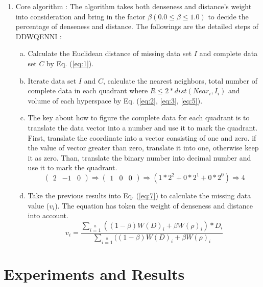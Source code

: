 \documentclass[print]{jicspack}
\begin{document}
\begin{enumerate}[(1)]
\item Core algorithm : The algorithm takes both denseness and distance's weight into consideration and bring in the factor $\beta (0.0 \leq \beta \leq 1.0)$ to decide the percentage of denseness and distance.  The followings are the detailed steps of DDWQENNI :
\begin{enumerate}[a.]
  \item Calculate the Euclidean distance of missing data set $I$ and complete data set $C$ by Eq. (\ref{eq:1}).
  \item Iterate data set $I$ and $C$, calculate the nearest neighbors, total number of complete data in each quadrant where $R \leq 2 * dist(Near_i, I_i)$ and volume of each hyperspace by Eq. (\ref{eq:2}, \ref{eq:3}, \ref{eq:5}).
  \item The key about how to figure the complete data for each quadrant is to translate the data vector into a number and use it to mark the quadrant. First, translate the coordinate into a vector consisting of one and zero. if the value of vector greater than zero, translate it into one, otherwise keep it as zero. Than, translate the binary number into decimal number and use it to mark the quadrant.
  \begin{equation}
  \label{eq:6}
  \begin{pmatrix} 2& -1& 0\end{pmatrix}\Rightarrow \begin{pmatrix} 1& 0& 0\end{pmatrix} \Rightarrow (1*2^2 + 0*2^1+ 0*2^0) \Rightarrow 4
  \end{equation}
  \item Take the previous results into Eq. (\ref{eq:7}) to calculate the missing data value ($v_i$). The equation has token the weight of denseness and distance into account.
  \begin{equation}
  \label{eq:7}
  v_i = \frac{\sum\limits_{i=1}\limits^{n}((1-\beta)W(D)_i + \beta W(\rho)_i) * D_i}{\sum\limits_{i=1}\limits^{n}((1-\beta)W(D)_i + \beta W(\rho)_i}
  \end{equation}
\end{enumerate}
\end{enumerate}

\section{Experiments and Results}
\end{document}
